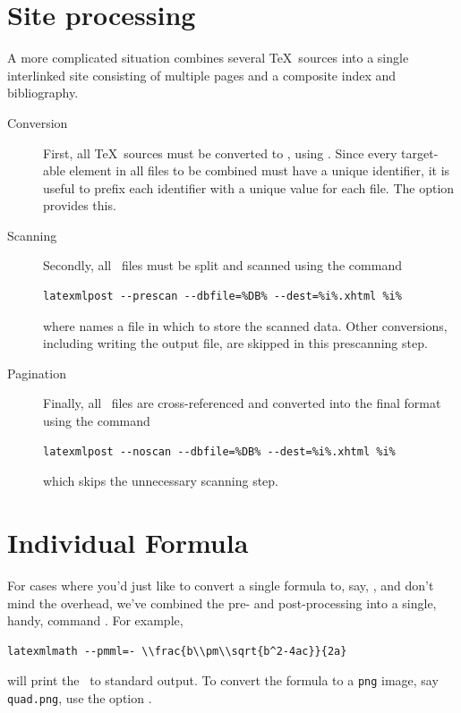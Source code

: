 \documentclass{book}
\begin{document}
\section[Sites]{Site processing}\label{usage.site}
A more complicated situation combines several \TeX\ sources
into a single interlinked site consisting of multiple pages
and a composite index and bibliography.

\begin{description}
\item[Conversion] First, all \TeX\ sources must be converted
   to \XML, using .  Since every target-able element
   in all files to be combined must have a unique identifier, it is useful to
   prefix each identifier with a unique value for each file. 
   The  option  provides this.

 \item[Scanning] Secondly, all \XML\ files must be split and scanned using
  the command
  \begin{lstlisting}[style=shell]
   latexmlpost --prescan --dbfile=%DB% --dest=%i%.xhtml %i%
  \end{lstlisting}
  where  names a file in which to store the scanned data.
  Other conversions, including writing the output file, are skipped in this prescanning step.
 
 \item[Pagination] Finally, all \XML\ files are cross-referenced and converted into
   the final format using the command
   \begin{lstlisting}[style=shell]
     latexmlpost --noscan --dbfile=%DB% --dest=%i%.xhtml %i%
   \end{lstlisting}
   which skips the unnecessary scanning step.
\end{description}

\section{Individual Formula}\label{usage.latexmlmath}
For cases where you'd just like to convert a single formula to, say, \MathML,
and don't mind the overhead, we've combined the pre- and post-processing into
a single, handy, command .  For example,
\begin{lstlisting}[style=shell]
  latexmlmath --pmml=- \\frac{b\\pm\\sqrt{b^2-4ac}}{2a}
\end{lstlisting}
will print the \MathML\ to standard output.  
To convert the formula to a \texttt{png} image, say \texttt{quad.png},
use the option .
\end{document}
